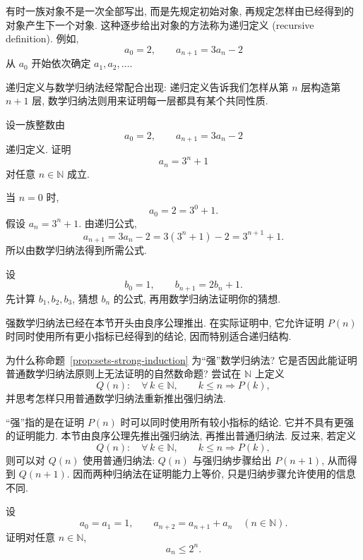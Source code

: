 \documentclass[usesamecnt, thmcnt=section, lang=cn, newtx, 10pt, scheme=chinese]{elegantbook}
\begin{document}
\begin{knowledge}[递归定义与归纳证明]
有时一族对象不是一次全部写出, 而是先规定初始对象, 再规定怎样由已经得到的对象产生下一个对象. 这种逐步给出对象的方法称为{\color{blue}递归定义 (recursive definition)}. 例如,
\[
 a_0=2,\qquad a_{n+1}=3a_n-2
\]
从 $a_0$ 开始依次确定 $a_1,a_2,\ldots$.

递归定义与数学归纳法经常配合出现: 递归定义告诉我们怎样从第 $n$ 层构造第 $n+1$ 层, 数学归纳法则用来证明每一层都具有某个共同性质.
\end{knowledge}

\begin{example}
设一族整数由
\[
 a_0=2,\qquad a_{n+1}=3a_n-2
\]
递归定义. 证明
\[
 a_n=3^n+1
\]
对任意 $n\in\mathbb N$ 成立.
\end{example}

\begin{solution}
当 $n=0$ 时,
\[
 a_0=2=3^0+1.
\]
假设 $a_n=3^n+1$. 由递归公式,
\[
 a_{n+1}
 =3a_n-2
 =3(3^n+1)-2
 =3^{n+1}+1.
\]
所以由数学归纳法得到所需公式.
\end{solution}

\begin{exercise}\label{ex:sets-induction-recursion}
设
\[
 b_0=1,\qquad b_{n+1}=2b_n+1.
\]
先计算 $b_1,b_2,b_3$, 猜想 $b_n$ 的公式, 再用数学归纳法证明你的猜想.
\end{exercise}

强数学归纳法已经在本节开头由良序公理推出. 在实际证明中, 它允许证明 $P(n)$ 时同时使用所有更小指标已经得到的结论, 因而特别适合递归结构.

\begin{concept}\label{con:sets-strong-induction}
为什么称命题~\ref{prop:sets-strong-induction} 为``强''数学归纳法? 它是否因此能证明普通数学归纳法原则上无法证明的自然数命题? 尝试在 $\mathbb N$ 上定义
\[
 Q(n):\quad
 \forall\,k\in\mathbb N,\qquad k\leq n\Rightarrow P(k),
\]
并思考怎样只用普通数学归纳法重新推出强归纳法.
\end{concept}

\begin{solution}
``强''指的是在证明 $P(n)$ 时可以同时使用所有较小指标的结论. 它并不具有更强的证明能力. 本节由良序公理先推出强归纳法, 再推出普通归纳法. 反过来, 若定义
\[
 Q(n):\quad
 \forall\,k\in\mathbb N,\qquad k\leq n\Rightarrow P(k),
\]
则可以对 $Q(n)$ 使用普通归纳法: $Q(n)$ 与强归纳步骤给出 $P(n+1)$, 从而得到 $Q(n+1)$. 因而两种归纳法在证明能力上等价, 只是归纳步骤允许使用的信息不同.
\end{solution}

\begin{example}
设
\[
 a_0=a_1=1,
 \qquad
 a_{n+2}=a_{n+1}+a_n
 \quad(n\in\mathbb N).
\]
证明对任意 $n\in\mathbb N$,
\[
 a_n\leq2^n.
\]
\end{example}
\end{document}
